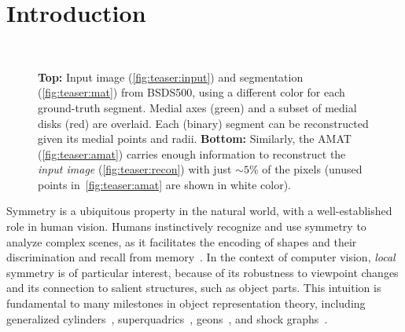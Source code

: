 \documentclass[10pt,twocolumn,letterpaper]{article}
\begin{document}
\section{Introduction}\label{sec:introduction}
\begin{figure}[!t]
\centering
\def\imgw{0.49}
 \\
\caption{\textbf{Top:} Input image (\ref{fig:teaser:input}) and segmentation (\ref{fig:teaser:mat}) from BSDS500,
using a different color for each ground-truth segment. 
Medial axes (green) and a subset of medial disks (red) are overlaid. 
Each (binary) segment can be reconstructed given its medial points and radii. 
\textbf{Bottom:} Similarly, the AMAT (\ref{fig:teaser:amat}) carries enough information to reconstruct the 
 \emph{input image} (\ref{fig:teaser:recon}) with just $\sim 5\%$ of the pixels 
 (unused points in~\ref{fig:teaser:amat} are shown in white color).}
\label{fig:teaser}
\end{figure}

Symmetry is a ubiquitous property in the natural world, with a well-established role in human vision.
Humans instinctively recognize and use symmetry to analyze complex scenes, as it facilitates the encoding of shapes and
their discrimination and recall from memory~\cite{barlow1979versatility,royer1981detection,wagemans1998parallel}.
In the context of computer vision, \emph{local} symmetry is of particular interest, 
because of its robustness to viewpoint changes and its connection to salient structures, such as object parts.
This intuition is fundamental to many milestones in object representation theory, including generalized
cylinders~\cite{binford1971visual}, superquadrics~\cite{barr1981superquadrics}, 
geons~\cite{biederman1987recognition}, and shock graphs~\cite{siddiqi1999shock}.
\end{document}
